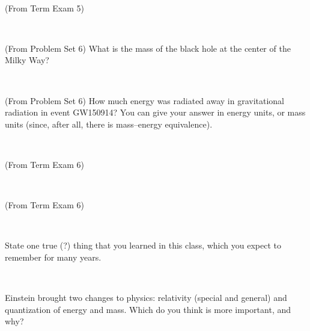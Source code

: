 \documentclass[12pt, letterpaper]{article}
\begin{document}
\vfill ~

\begin{problem}
(From Term Exam 5)
\end{problem}

\vfill ~

\clearpage

\begin{problem}
  (From Problem Set 6)
  What is the mass of the black hole at the center of the Milky Way?
\end{problem}

\vfill ~

\begin{problem}
  (From Problem Set 6)
  How much energy was radiated away in gravitational radiation in event GW150914?
  You can give your answer in energy units, or mass units (since, after all, there
  is mass--energy equivalence).
\end{problem}

\vfill ~

\begin{problem}
(From Term Exam 6)
\end{problem}

\vfill ~

\begin{problem}
(From Term Exam 6)
\end{problem}

\vfill ~

\clearpage

\begin{problem}
State one true (?) thing that you learned in this class,
which you expect to remember for many years.
\end{problem}

\vfill ~

\begin{problem}
Einstein brought two changes to physics: relativity (special and general) and
quantization of energy and mass. Which do you think is more important, and why?
\end{problem}

\vfill ~

~

\vfill ~

~

\vfill ~
\end{document}
